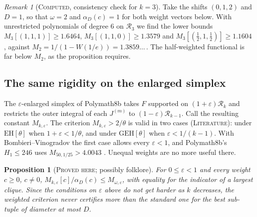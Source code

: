 \documentclass[11pt]{amsart}
\newtheorem{proposition}[theorem]{Proposition}
\theoremstyle{definition}
\theoremstyle{remark}
\newtheorem{remark}[theorem]{Remark}
\newcommand{\lbl}[1]{\textup{\textsc{#1}}}
\newcommand{\R}{\mathcal{R}}
\begin{document}
\begin{remark}[\lbl{Computed}, consistency check for $k=3$]
Take the shifts $(0,1,2)$ and $D=1$, so that $\omega=2$ and $\alpha_D(c)=1$
for both weight vectors below.
With unrestricted polynomials of degree $6$ on $\R_3$ we find the lower bounds
$M_3[(1,1,1)]\ge1.6464$, $M_3[(1,1,0)]\ge1.3579$ and
$M_3[(\tfrac12,1,\tfrac12)]\ge1.1604$, against
$M_2=1/(1-W(1/e))=1.3859\ldots$\,. The half-weighted functional is far below
$M_2$, as the proposition requires.
\end{remark}

\subsection*{The same rigidity on the enlarged simplex}
The $\varepsilon$-enlarged simplex of Polymath8b \cite[Thm.~3.12]{Pol14b}
takes $F$
supported on $(1+\varepsilon)\R_k$ and restricts the outer integral of each
$J^{(m)}$ to $(1-\varepsilon)\R_{k-1}$. Call the resulting constant
$M_{k,\varepsilon}$. The criterion $M_{k,\varepsilon}>2/\theta$ is valid in
two cases (\lbl{Literature}): under $\mathrm{EH}[\theta]$ when
$1+\varepsilon<1/\theta$, and under $\mathrm{GEH}[\theta]$ when
$\varepsilon<1/(k-1)$. With Bombieri--Vinogradov the first case allows every
$\varepsilon<1$, and Polymath8b's $H_1\le246$ uses $M_{50,1/25}>4.0043$
\cite[Thm.~3.13]{Pol14b}. Unequal weights are no more useful there.

\begin{proposition}[\lbl{Proved here}; possibly folklore]\label{prop:rigid-eps}
For $0\le\varepsilon<1$ and every weight $c\ge0$, $c\ne0$,
$M_{k,\varepsilon}[c]/\alpha_D(c)\le M_{\omega,\varepsilon}$, with equality
for the indicator of a largest clique. Since the conditions on $\varepsilon$
above do not get harder as $k$ decreases, the weighted criterion never
certifies more than the standard one for the best sub-tuple of diameter at
most $D$.
\end{proposition}
\end{document}
